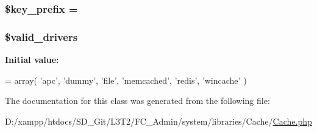 \subsubsection[{\$key\+\_\+prefix}]{\setlength{\rightskip}{0pt plus 5cm}\$key\+\_\+prefix = \textquotesingle{}\textquotesingle{}}\label{class_c_i___cache_ac5ae5bfe56bac385a2687d7503487f38}
\hypertarget{class_c_i___cache_a32d963b3d49fd67f188c1a74d38be6df}{}
\subsubsection[{\$valid\+\_\+drivers}]{\setlength{\rightskip}{0pt plus 5cm}\$valid\+\_\+drivers\hspace{0.3cm}{\ttfamily [protected]}}\label{class_c_i___cache_a32d963b3d49fd67f188c1a74d38be6df}
{\bfseries Initial value\+:}
\begin{DoxyCode}
= array(
        \textcolor{stringliteral}{'apc'},
        \textcolor{stringliteral}{'dummy'},
        \textcolor{stringliteral}{'file'},
        \textcolor{stringliteral}{'memcached'},
        \textcolor{stringliteral}{'redis'},
        \textcolor{stringliteral}{'wincache'}
    )
\end{DoxyCode}


The documentation for this class was generated from the following file\+:\begin{DoxyCompactItemize}
\item 
D\+:/xampp/htdocs/\+S\+D\+\_\+\+Git/\+L3\+T2/\+F\+C\+\_\+\+Admin/system/libraries/\+Cache/\hyperlink{_cache_8php}{Cache.\+php}\end{DoxyCompactItemize}
